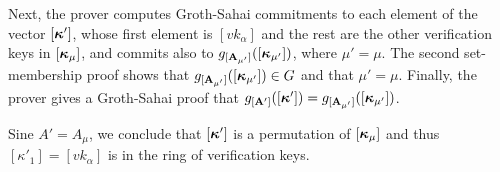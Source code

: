 Next, the prover computes Groth-Sahai commitments to each element of the vector $[{\boldsymbol{\kappa}}']$, whose first element is $[vk_\alpha]$ and the rest are the other verification keys in $[{\boldsymbol{\kappa}}_\mu]$, and commits also to $g_{[\mathbf{{A_{\mu'}}}]}([{\boldsymbol{\kappa}}_{\mu'}])$, where $\mu'=\mu$. The second set-membership proof shows that $g_{[\mathbf{{A_{\mu'}}}]}([{\boldsymbol{\kappa}}_{\mu'}])\in G$ and that $\mu'=\mu$. Finally, the prover gives a Groth-Sahai proof that $g_{[\mathbf{{A}}']}([{\boldsymbol{\kappa}}'])=g_{[\mathbf{{A_{\mu'}}}]}([{\boldsymbol{\kappa}}_{\mu'}])$.

Sine $A'=A_\mu$, we conclude that $[{\boldsymbol{\kappa}}']$ is a permutation of $[{\boldsymbol{\kappa}}_\mu]$ and thus $[\kappa'_1]=[vk_\alpha]$ is in the ring of verification keys.


